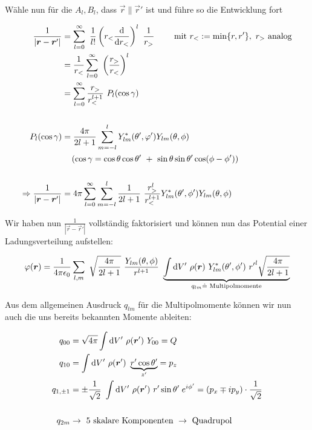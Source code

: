 Wähle nun für die $A_l, B_l$, dass $\vec{r}\parallel\vec{r}'$ ist und führe so die Entwicklung fort

\begin{align*}
\frac{1}{|\vec{r}-\vec{r}'|} &= \sum_{l=0}^{\infty} \ \frac{1}{l!} \left(\-r_{<}\diff{}{r_{<}}\right)^l \ \frac{1}{r_{>}} \qquad \text{ mit } r_{<} := \min\{r,r'\}, \ r_{>} \text{ analog}\\
&= \frac{1}{r_{<}}\sum_{l=0}^{\infty} \ \left(\frac{r_{>}}{r_{<}}\right)^l\\
&=  \sum_{l=0}^{\infty} \frac{r_{>}}{r_{<}^{l+1}} \ P_l (\cos\gamma)\\
\\
P_l (\cos\gamma) &= \frac{4\pi}{2l+1}\sum_{m=-l}^{l}  Y^{*}_{lm}(\theta',\varphi')Y_{lm}(\theta,\phi)\\
& \quad\left(\cos\gamma = \cos\theta\cos\theta' \ + \ \sin\theta\sin\theta'\cos(\phi-\phi')\right)\\
\\
\Rightarrow \frac{1}{|\vec{r}-\vec{r}'|} &= 4\pi \sum_{l=0}^{\infty}\sum_{m=-l}^{l} \frac{1}{2l+1}\ \frac{r_{>}^l}{r_{<}^{l+1}} Y^{*}_{lm}(\theta',\phi')Y_{lm}(\theta,\phi)
\end{align*}

Wir haben nun $\frac{1}{|\vec{r}-\vec{r}'|}$ vollständig faktorisiert und können nun das Potential einer Ladungsverteilung aufstellen:

\begin{equation*}
\varphi (\vec{r}) = \frac{1}{4\pi\epsilon_0} \sum_{l,m} \ \sqrt{\frac{4\pi}{2l +1}} \ \frac{Y_{lm}(\theta,\phi)}{r^{l+1}} \ \underbrace{\int\d V' \  \rho(\vec{r}) \  Y_{lm}^{*}(\theta',\phi') \ {r'}^l \sqrt{\frac{4\pi}{2l+1}}}_{q_{lm} \hat{=} \text{ Multipolmomente}}
\end{equation*}

Aus dem allgemeinen Ausdruck $q_{lm}$ für die Multipolmomente können wir nun auch die uns bereits bekannten Momente ableiten:

\begin{align*}
q_{00} &= \sqrt{4\pi}\int\d V' \ \rho(\vec{r}') \ Y_{00} = Q
\\
q_{10} &= \int\d V' \ \rho(\vec{r}') \ \underbrace{r'\cos\theta'}_{z'} = p_z\\
q_{1,\pm 1} &= \pm \frac{1}{\sqrt{2}} \ \int\d V' \ \rho(\vec{r}')  \ r'\sin\theta' \; e^{i\phi'} = (p_x \mp i p_y) \cdot \frac{1}{\sqrt{2}}\\
\\q_{2m} &\rightarrow \text{ 5 skalare Komponenten } \rightarrow \text{ Quadrupol}
\end{align*}